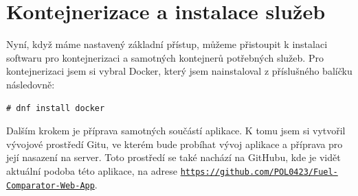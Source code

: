 \section{Kontejnerizace a instalace služeb}
Nyní, když máme nastavený základní přístup, můžeme přistoupit
k instalaci softwaru pro kontejnerizaci a samotných kontejnerů
potřebných služeb. Pro kontejnerizaci jsem si vybral Docker,
který jsem nainstaloval z příslušného balíčku následovně:

\begin{verbatim}
# dnf install docker
\end{verbatim}

Dalším krokem je příprava samotných součástí aplikace. K tomu
jsem si vytvořil vývojové prostředí Gitu, ve kterém bude
probíhat vývoj aplikace a příprava pro její nasazení na server.
Toto prostředí se také nachází na GitHubu, kde je vidět
aktuální podoba této aplikace, na adrese
\hyperlink{https://github.com/POL0423/Fuel-Comparator-Web-App
}{\texttt{https://github.com/POL0423/Fuel-Comparator-Web-App}}.


\endinput
